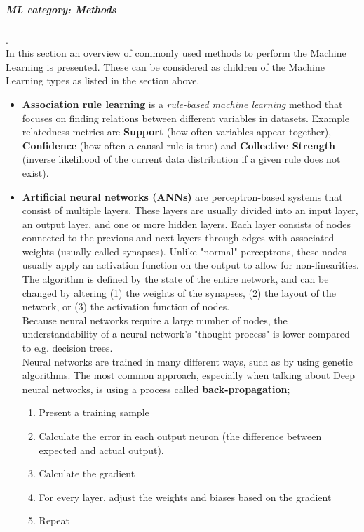 \subparagraph{ML category: Methods}
.\\
In this section an overview of commonly used methods to perform the Machine Learning is presented. These can be considered as children of the Machine Learning types as listed in the section above.
\begin{itemize}
	\item \textbf{Association rule learning}
		is a \textit{rule-based machine learning} method that focuses on finding relations between different variables in datasets. Example relatedness metrics are \textbf{Support} (how often variables appear together), \textbf{Confidence} (how often a causal rule is true) and \textbf{Collective Strength} (inverse likelihood of the current data distribution if a given rule does not exist).
	\item \textbf{Artificial neural networks (ANNs)}
		are perceptron-based systems that consist of multiple layers. These layers are usually divided into an input layer, an output layer, and one or more hidden layers. Each layer consists of nodes connected to the previous and next layers through edges with associated weights (usually called synapses). Unlike "normal" perceptrons, these nodes usually apply an activation function on the output to allow for non-linearities.\\
		The algorithm is defined by the state of the entire network, and can be changed by altering (1) the weights of the synapses, (2) the layout of the network, or (3) the activation function of nodes.\\
		Because neural networks require a large number of nodes, the understandability of a neural network's "thought process" is lower compared to e.g. decision trees.\\
		Neural networks are trained in many different ways, such as by using genetic algorithms. The most common approach, especially when talking about Deep neural networks, is using a process called \textbf{back-propagation};
		\begin{enumerate}
			\item Present a training sample
			\item Calculate the error in each output neuron (the difference between expected and actual output).
			\item Calculate the gradient
			\item For every layer, adjust the weights and biases based on the gradient
			\item Repeat
		\end{enumerate}

\end{itemize}
